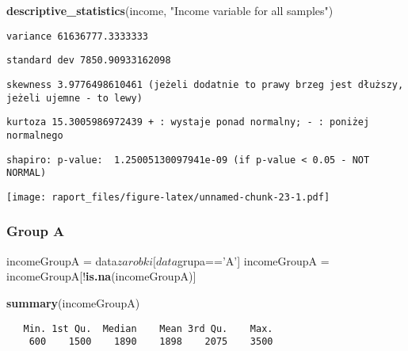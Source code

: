 \documentclass[]{article}
\newenvironment{Shaded}{\begin{snugshade}}{\end{snugshade}}
\newcommand{\KeywordTok}[1]{\textcolor[rgb]{0.13,0.29,0.53}{\textbf{{#1}}}}
\newcommand{\StringTok}[1]{\textcolor[rgb]{0.31,0.60,0.02}{{#1}}}
\newcommand{\NormalTok}[1]{{#1}}
\begin{document}
\begin{Shaded}
\begin{Highlighting}[]
\KeywordTok{descriptive_statistics}\NormalTok{(income, }\StringTok{"Income variable for all samples"}\NormalTok{)}
\end{Highlighting}
\end{Shaded}

\begin{verbatim}
variance 61636777.3333333
\end{verbatim}

\begin{verbatim}
standard dev 7850.90933162098
\end{verbatim}

\begin{verbatim}
skewness 3.9776498610461 (jeżeli dodatnie to prawy brzeg jest dłuższy, jeżeli ujemne - to lewy)
\end{verbatim}

\begin{verbatim}
kurtoza 15.3005986972439 + : wystaje ponad normalny; - : poniżej normalnego
\end{verbatim}

\begin{verbatim}
shapiro: p-value:  1.25005130097941e-09 (if p-value < 0.05 - NOT NORMAL)
\end{verbatim}

\texttt{[image: raport\_files/figure-latex/unnamed-chunk-23-1.pdf]}

\subsubsection{Group A}\label{group-a-2}

\begin{Shaded}
\begin{Highlighting}[]
\NormalTok{incomeGroupA =}\StringTok{ }\NormalTok{data$zarobki[data$grupa==}\StringTok{'A'}\NormalTok{]}
\NormalTok{incomeGroupA =}\StringTok{ }\NormalTok{incomeGroupA[!}\KeywordTok{is.na}\NormalTok{(incomeGroupA)]}

\KeywordTok{summary}\NormalTok{(incomeGroupA)}
\end{Highlighting}
\end{Shaded}

\begin{verbatim}
   Min. 1st Qu.  Median    Mean 3rd Qu.    Max. 
    600    1500    1890    1898    2075    3500 
\end{verbatim}
\end{document}
